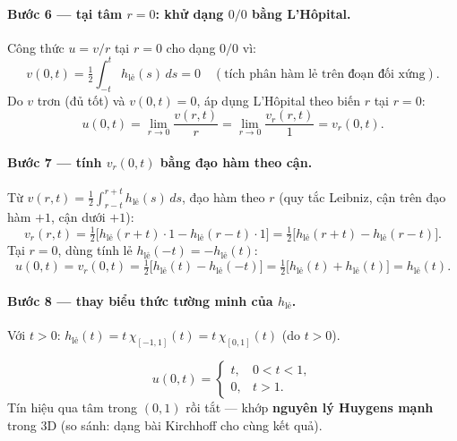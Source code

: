 \paragraph{Bước 6 --- tại tâm $r=0$: khử dạng $0/0$ bằng L'Hôpital.}\leavevmode

Công thức $u=v/r$ tại $r=0$ cho dạng $0/0$ vì:
\[
  v(0,t)=\tfrac12\int_{-t}^{t} h_{\mathrm{lẻ}}(s)\,ds=0\quad (\text{tích phân hàm lẻ trên đoạn đối xứng}).
\]
Do $v$ trơn (đủ tốt) và $v(0,t)=0$, áp dụng L'Hôpital theo biến $r$ tại $r=0$:
\[
  u(0,t)=\lim_{r\to0}\frac{v(r,t)}{r}=\lim_{r\to0}\frac{v_r(r,t)}{1}=v_r(0,t).
\]

\paragraph{Bước 7 --- tính $v_r(0,t)$ bằng đạo hàm theo cận.}\leavevmode

Từ $v(r,t)=\tfrac12\int_{r-t}^{r+t} h_{\mathrm{lẻ}}(s)\,ds$, đạo hàm theo $r$ (quy tắc Leibniz, cận trên đạo hàm $+1$, cận dưới $+1$):
\[
  v_r(r,t)=\tfrac12\big[h_{\mathrm{lẻ}}(r+t)\cdot 1-h_{\mathrm{lẻ}}(r-t)\cdot 1\big]
  =\tfrac12\big[h_{\mathrm{lẻ}}(r+t)-h_{\mathrm{lẻ}}(r-t)\big].
\]
Tại $r=0$, dùng tính lẻ $h_{\mathrm{lẻ}}(-t)=-h_{\mathrm{lẻ}}(t)$:
\[
  u(0,t)=v_r(0,t)=\tfrac12\big[h_{\mathrm{lẻ}}(t)-h_{\mathrm{lẻ}}(-t)\big]=\tfrac12\big[h_{\mathrm{lẻ}}(t)+h_{\mathrm{lẻ}}(t)\big]=h_{\mathrm{lẻ}}(t).
\]

\paragraph{Bước 8 --- thay biểu thức tường minh của $h_{\mathrm{lẻ}}$.}\leavevmode

Với $t>0$: $h_{\mathrm{lẻ}}(t)=t\,\chi_{[-1,1]}(t)=t\,\chi_{[0,1]}(t)$ (do $t>0$).

\begin{nhobox}
\[
  u(0,t)=\begin{cases} t, & 0<t<1,\\ 0, & t>1.\end{cases}
\]
Tín hiệu qua tâm trong $(0,1)$ rồi tắt --- khớp \textbf{nguyên lý Huygens mạnh} trong 3D (so sánh: dạng bài Kirchhoff cho cùng kết quả).
\end{nhobox}
